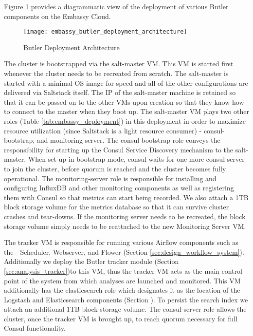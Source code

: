 Figure \ref{fig:embassy_butler_deployment_architecture} provides a diagrammatic view of the deployment of various Butler components on the Embassy Cloud.

\begin{figure}[H]
\texttt{[image: embassy\_butler\_deployment\_architecture]}
\centering
\caption {Butler Deployment Architecture}
\label{fig:embassy_butler_deployment_architecture}
\end{figure}

The cluster is bootstrapped via the salt-master VM. This VM is started first whenever the cluster needs to be recreated from scratch. The salt-master is started with a minimal OS image for speed and all of the other configurations are delivered via Saltstack itself. The IP of the salt-master machine is retained so that it can be passed on to the other VMs upon creation so that they know how to connect to the master when they boot up. The salt-master VM plays two other roles (Table \ref{tab:embassy_deployment}) in this deployment in order to maximize resource utilization (since Saltstack is a light resource consumer) - consul-bootstrap, and monitoring-server. The consul-bootstrap role conveys the responsibility for starting up the Consul Service Discovery mechanism to the salt-master. When set up in bootstrap mode, consul waits for one more consul server to join the cluster, before quorum is reached and the cluster becomes fully operational. The monitoring-server role is responsible for installing and configuring InfluxDB and other monitoring components  as well as registering them with Consul so that metrics can start being recorded. We also attach a 1TB block storage volume for the metrics database so that it can survive cluster crashes and tear-downs. If the monitoring server needs to be recreated, the block storage volume simply needs to be reattached to the new Monitoring Server VM.

The tracker VM is responsible for running various Airflow components such as the - Scheduler, Webserver, and Flower (Section \ref{sec:design_workflow_system}). Additionally we deploy the Butler tracker module (Section \ref{sec:analysis_tracker})to this VM, thus the tracker VM acts as the main control point of the system from which analyses are launched and monitored. This VM additionally has the elasticsearch role which designates it as the location of the Logstash and Elasticsearch components (Section \label{sec:design_log_collection}). To persist the search index we attach an additional 1TB block storage volume. The consul-server role allows the cluster, once the tracker VM is brought up, to reach quorum necessary for full Consul functionality. 

